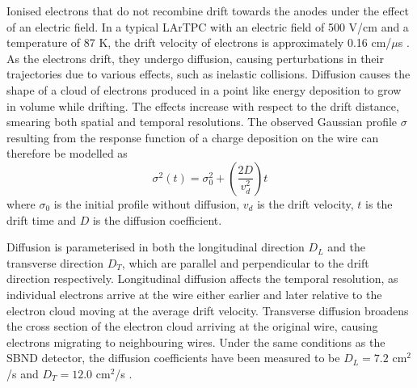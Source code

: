 Ionised electrons that do not recombine drift towards the anodes under the effect of an electric field.
In a typical LArTPC with an electric field of 500 V/cm and a temperature of 87 K, the drift velocity of electrons is approximately 0.16 cm/$\mu$s \cite{drift_vel}.
As the electrons drift, they undergo diffusion, causing perturbations in their trajectories due to various effects, such as inelastic collisions.
Diffusion causes the shape of a cloud of electrons produced in a point like energy deposition to grow in volume while drifting.
The effects increase with respect to the drift distance, smearing both spatial and temporal resolutions.
The observed Gaussian profile $\sigma$ resulting from the response function of a charge deposition on the wire can therefore be modelled as \cite{uboone_diff} 
\begin{equation}
	\sigma^{2} (t) = \sigma^{2}_{0} + \left(\frac{2D}{v^{2}_{d}}\right)t
\end{equation}
where $\sigma_{0}$ is the initial profile without diffusion, $v_{d}$ is the drift velocity, $t$ is the drift time and $D$ is the diffusion coefficient.

Diffusion is parameterised in both the longitudinal direction $D_{L}$ and the transverse direction $D_{T}$, which are parallel and perpendicular to the drift direction respectively.
Longitudinal diffusion affects the temporal resolution, as individual electrons arrive at the wire either earlier and later relative to the electron cloud moving at the average drift velocity.
Transverse diffusion broadens the cross section of the electron cloud arriving at the original wire, causing electrons migrating to neighbouring wires.
Under the same conditions as the SBND detector, the diffusion coefficients have been measured to be $D_{L} = 7.2 $ cm$^{2}$/s and $D_T = 12.0 $ cm$^{2}$/s \cite{drift_vel}.


